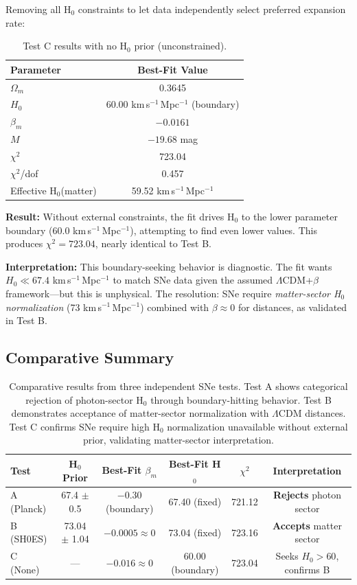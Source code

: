 \documentclass[twocolumn,superscriptaddress,prd,amsmath,amssymb]{revtex4-2}
\begin{document}
Removing all H$_0$ constraints to let data independently select preferred expansion rate:

\begin{table}[h]
\centering
\begin{tabular}{lc}
\hline\hline
Parameter & Best-Fit Value \\
\hline
$\Omega_m$ & 0.3645 \\
$H_0$ & 60.00 km\,s$^{-1}$\,Mpc$^{-1}$ (boundary) \\
$\beta_m$ & $-0.0161$ \\
$M$ & $-19.68$ mag \\
\hline
$\chi^2$ & 723.04 \\
$\chi^2$/dof & 0.457 \\
\hline
Effective H$_0$(matter) & 59.52 km\,s$^{-1}$\,Mpc$^{-1}$ \\
\hline\hline
\end{tabular}
\caption{Test C results with no H$_0$ prior (unconstrained).}
\label{tab:test_c}
\end{table}

\textbf{Result:} Without external constraints, the fit drives H$_0$ to the lower parameter boundary (60.0 km\,s$^{-1}$\,Mpc$^{-1}$), attempting to find even lower values. This produces $\chi^2 = 723.04$, nearly identical to Test B.

\textbf{Interpretation:} This boundary-seeking behavior is diagnostic. The fit wants $H_0 \ll 67.4$ km\,s$^{-1}$\,Mpc$^{-1}$ to match SNe data given the assumed $\Lambda$CDM+$\beta$ framework---but this is unphysical. The resolution: SNe require \textit{matter-sector H$_0$ normalization} (73 km\,s$^{-1}$\,Mpc$^{-1}$) combined with $\beta \approx 0$ for distances, as validated in Test B.

\subsection{Comparative Summary}

\begin{table}[t]
\centering
\begin{tabular}{lccccc}
\hline\hline
Test & H$_0$ Prior & Best-Fit $\beta_m$ & Best-Fit H$_0$ & $\chi^2$ & Interpretation \\
\hline
A (Planck) & 67.4 $\pm$ 0.5 & $-0.30$ (boundary) & 67.40 (fixed) & 721.12 & \textbf{Rejects} photon sector \\
B (SH0ES) & 73.04 $\pm$ 1.04 & $-0.0005 \approx 0$ & 73.04 (fixed) & 723.16 & \textbf{Accepts} matter sector \\
C (None) & --- & $-0.016 \approx 0$ & 60.00 (boundary) & 723.04 & Seeks $H_0 > 60$, confirms B \\
\hline\hline
\end{tabular}
\caption{Comparative results from three independent SNe tests. Test A shows categorical rejection of photon-sector H$_0$ through boundary-hitting behavior. Test B demonstrates acceptance of matter-sector normalization with $\Lambda$CDM distances. Test C confirms SNe require high H$_0$ normalization unavailable without external prior, validating matter-sector interpretation.}
\label{tab:summary}
\end{table}
\end{document}
